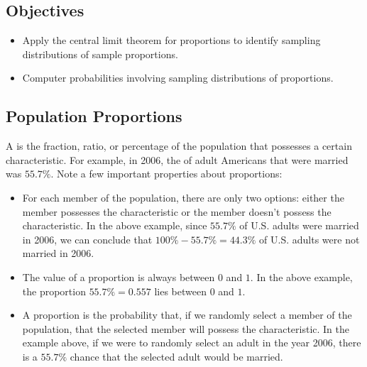\documentclass[letterpaper,10pt,english]{jupyterBook}
\begin{document}
\subsection{Objectives}
\label{\detokenize{Ch4 The Normal Distribution and the Central Limit Theorem/4.5 The Central Limit Theorem for Proportions:objectives}}\begin{itemize}
\item {} 
\sphinxAtStartPar
Apply the central limit theorem for proportions to identify sampling distributions of sample proportions.

\item {} 
\sphinxAtStartPar
Computer probabilities involving sampling distributions of proportions.

\end{itemize}


\subsection{Population Proportions}
\label{\detokenize{Ch4 The Normal Distribution and the Central Limit Theorem/4.5 The Central Limit Theorem for Proportions:population-proportions}}
\sphinxAtStartPar
A  is the fraction, ratio, or percentage of the population that possesses a certain characteristic. For example, in 2006, the  of adult Americans that were married was \(55.7\%\). Note a few important properties about proportions:
\begin{itemize}
\item {} 
\sphinxAtStartPar
For each member of the population, there are only two options: either the member possesses the characteristic or the member doesn’t possess the characteristic. In the above example, since \(55.7\%\) of U.S. adults were married in 2006, we can conclude that \(100\% - 55.7\% = 44.3\%\) of U.S. adults were not married in 2006.

\item {} 
\sphinxAtStartPar
The value of a proportion is always between \(0\) and \(1\). In the above example, the proportion \(55.7\% = 0.557\) lies between \(0\) and \(1\).

\item {} 
\sphinxAtStartPar
A proportion is the probability that, if we randomly select a member of the population, that the selected member will possess the characteristic. In the example above, if we were to randomly select an adult in the year 2006, there is a \(55.7\%\) chance that the selected adult would be married.

\end{itemize}
\end{document}
